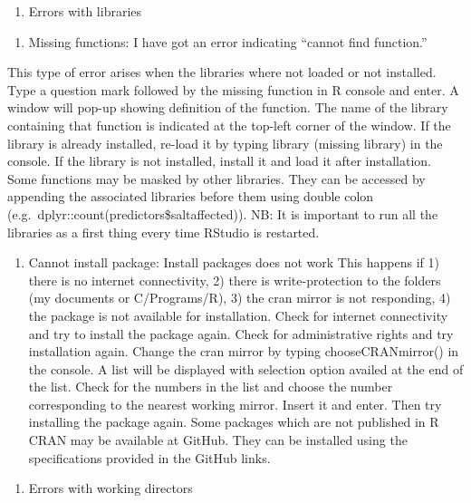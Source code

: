 \documentclass[
  10pt,
  b5paper,
]{book}
\providecommand{\tightlist}{%
  \setlength{\itemsep}{0pt}\setlength{\parskip}{0pt}}
\begin{document}
\begin{enumerate}
\def\labelenumi{\Alph{enumi}.}
\setcounter{enumi}{1}
\tightlist
\item
  Errors with libraries
\end{enumerate}

\begin{enumerate}
\def\labelenumi{\arabic{enumi}.}
\tightlist
\item
  Missing functions: I have got an error indicating ``cannot find function.''
\end{enumerate}

This type of error arises when the libraries where not loaded or not installed. Type a question mark followed by the missing function in R console and enter. A window will pop-up showing definition of the function. The name of the library containing that function is indicated at the top-left corner of the window. If the library is already installed, re-load it by typing library (missing library) in the console. If the library is not installed, install it and load it after installation. Some functions may be masked by other libraries. They can be accessed by appending the associated libraries before them using double colon (e.g.~dplyr::count(predictors\$saltaffected)). NB: It is important to run all the libraries as a first thing every time RStudio is restarted.

\begin{enumerate}
\def\labelenumi{\arabic{enumi}.}
\setcounter{enumi}{1}
\tightlist
\item
  Cannot install package: Install packages does not work
  This happens if 1) there is no internet connectivity, 2) there is write-protection to the folders (my documents or C/Programs/R), 3) the cran mirror is not responding, 4) the package is not available for installation. Check for internet connectivity and try to install the package again. Check for administrative rights and try installation again. Change the cran mirror by typing chooseCRANmirror() in the console. A list will be displayed with selection option availed at the end of the list. Check for the numbers in the list and choose the number corresponding to the nearest working mirror. Insert it and enter. Then try installing the package again. Some packages which are not published in R CRAN may be available at GitHub. They can be installed using the specifications provided in the GitHub links.
\end{enumerate}

\begin{enumerate}
\def\labelenumi{\Alph{enumi}.}
\setcounter{enumi}{2}
\tightlist
\item
  Errors with working directors
\end{enumerate}
\end{document}
